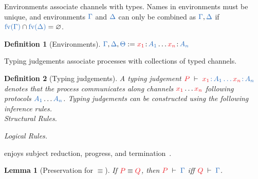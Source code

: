 \documentclass[draft,submission,copyright,creativecommons]{eptcs}
\newtheorem{definition}{Definition}
\newtheorem{lemma}{Lemma}
\begin{document}
Environments associate channels with types.
Names in environments must be unique, and environments $\ty{\Gamma}$ and
$\ty{\Delta}$ can only be combined as $\ty{\Gamma}, \ty{\Delta}$ if
$\ty{\fv{\Gamma}} \cap \ty{\fv{\Delta}} = \varnothing$.
\begin{definition}[Environments]\label{def:cp-environments}
  \(
    \ty{\Gamma}, \ty{\Delta}, \ty{\Theta} := \tmty{x_1}{A_1}\dots\tmty{x_n}{A_n}
  \) 
\end{definition}
Typing judgements associate processes with collections of typed channels.
\begin{definition}[Typing judgements]\label{def:cp}
  A typing judgement $\seq[{ P }]{\tmty{x_1}{A_1}\dots\tmty{x_n}{A_n}}$ denotes
  that the process  communicates along channels $\tm{x_1}\dots\tm{x_n}$
  following protocols $\ty{A_1}\dots\ty{A_n}$.
  Typing judgements can be constructed using the following inference rules.
  \\[0.5\baselineskip]
  Structural Rules.
  \begin{center}\cpInfAx     \cpInfCut  \end{center}\vspace*{0.5\baselineskip}

  Logical Rules.
  \begin{center}\cpInfTens   \cpInfParr \end{center}\vspace*{0.5\baselineskip}
  \begin{center}\cpInfOne    \cpInfBot  \end{center}\vspace*{0.5\baselineskip}
  \begin{center}  \end{center}\vspace*{0.5\baselineskip}
  \begin{center}\cpInfWith              \end{center}\vspace*{0.5\baselineskip}
  \begin{center}\cpInfNil    \cpInfTop  \end{center}\vspace*{0.5\baselineskip}
\end{definition}
\cp enjoys subject reduction, progress, and termination~\cite{wadler2012}.
\begin{lemma}[Preservation for $\equiv$]\label{lem:cp-preservation-equiv}
  If $\tm{P}\equiv\tm{Q}$, then $\seq[P]{\Gamma}$ iff $\seq[Q]{\Gamma}$.
\end{lemma}
\end{document}
